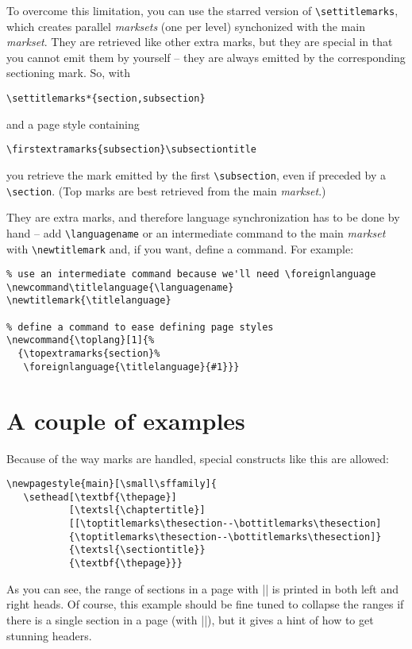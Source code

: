 \documentclass[a4paper]{ltxguide}
\begin{document}
To overcome this limitation, you can use the starred version of
\verb|\settitlemarks|, which creates parallel \textit{marksets} (one per 
level) synchonized with the main \textit{markset}. They are retrieved like 
other extra marks, but they are special in that you cannot emit them 
by yourself -- they are always emitted by the corresponding 
sectioning mark. So, with
\begin{verbatim}
\settitlemarks*{section,subsection}
\end{verbatim}
and a page style containing
\begin{verbatim}
\firstextramarks{subsection}\subsectiontitle
\end{verbatim}
you retrieve the mark emitted by the first \verb|\subsection|, even 
if preceded by a \verb|\section|. (Top marks are best retrieved from
the main \textit{markset}.)

They are extra marks, and therefore language synchronization has to be
done by hand -- add \verb|\languagename| or an intermediate command to
the main \textit{markset} with \verb|\newtitlemark| and, if you want,
define a command. For example:
\begin{verbatim}
% use an intermediate command because we'll need \foreignlanguage
\newcommand\titlelanguage{\languagename}
\newtitlemark{\titlelanguage}

% define a command to ease defining page styles
\newcommand{\toplang}[1]{%
  {\topextramarks{section}%
   \foreignlanguage{\titlelanguage}{#1}}}
\end{verbatim}

\section{A couple of examples}

Because of the way marks are handled, special constructs like this are 
allowed: 
\begin{verbatim}
\newpagestyle{main}[\small\sffamily]{
   \sethead[\textbf{\thepage}] 
           [\textsl{\chaptertitle}]
           [[\toptitlemarks\thesection--\bottitlemarks\thesection]
           {\toptitlemarks\thesection--\bottitlemarks\thesection]} 
           {\textsl{\sectiontitle}}
           {\textbf{\thepage}}}
\end{verbatim}
As you can see, the range of sections in a page with |\thesection| is
printed in both left and right heads.  Of course, this example should
be fine tuned to collapse the ranges if there is a single section in a
page (with |\ifsamemark|), but it gives a hint of how to get stunning
headers.
\end{document}
